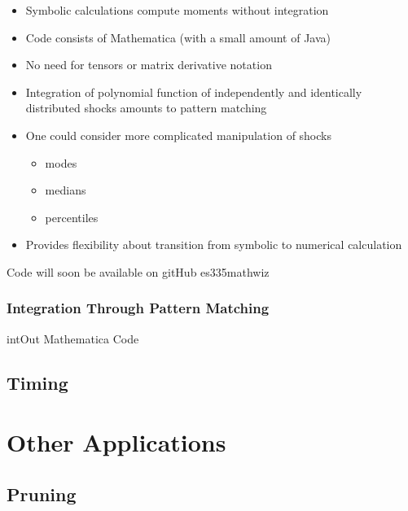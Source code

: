 \documentclass[12pt]{article}
\begin{document}
  \begin{itemize}
  \item Symbolic calculations compute moments without integration


  \end{itemize}


  \begin{itemize}
  \item Code consists of Mathematica (with a small amount of Java)
  \item No need for tensors or matrix derivative notation
  \item Integration of polynomial function of independently and identically distributed shocks amounts to pattern matching
  \item One could consider more complicated manipulation of shocks
    \begin{itemize}
    \item modes
\item  medians 
\item percentiles
    \end{itemize}
   \item Provides flexibility about transition from symbolic to numerical calculation
  \end{itemize}


{\small Code will soon be available on gitHub es335mathwiz }




\subsubsection{Integration Through Pattern Matching}
\label{sec:integr-thro-patt}

{intOut Mathematica Code}

{\tiny
{}
}


\subsection{Timing}
\label{sec:timing}



\section{Other Applications}
\label{sec:other-applications}

\subsection{Pruning}
\label{sec:pruning}
\end{document}
